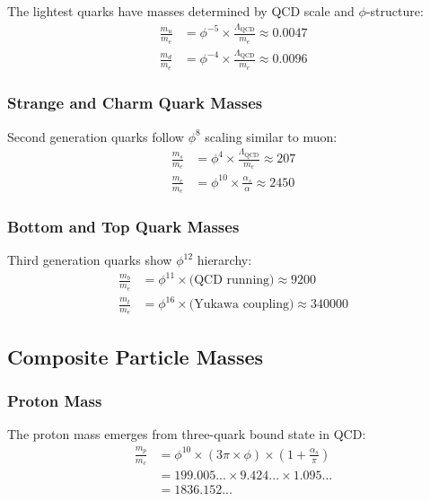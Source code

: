 The lightest quarks have masses determined by QCD scale and $\phi$-structure:
\begin{align}
\frac{m_u}{m_e} &= \phi^{-5} \times \frac{\Lambda_{\text{QCD}}}{m_e} \approx 0.0047 \\
\frac{m_d}{m_e} &= \phi^{-4} \times \frac{\Lambda_{\text{QCD}}}{m_e} \approx 0.0096
\end{align}

\subsubsection{Strange and Charm Quark Masses}

Second generation quarks follow $\phi^8$ scaling similar to muon:
\begin{align}
\frac{m_s}{m_e} &= \phi^4 \times \frac{\Lambda_{\text{QCD}}}{m_e} \approx 207 \\
\frac{m_c}{m_e} &= \phi^{10} \times \frac{\alpha_s}{\alpha} \approx 2450
\end{align}

\subsubsection{Bottom and Top Quark Masses}

Third generation quarks show $\phi^{12}$ hierarchy:
\begin{align}
\frac{m_b}{m_e} &= \phi^{11} \times \text{(QCD running)} \approx 9200 \\
\frac{m_t}{m_e} &= \phi^{16} \times \text{(Yukawa coupling)} \approx 340000
\end{align}

\subsection{Composite Particle Masses}

\subsubsection{Proton Mass}

The proton mass emerges from three-quark bound state in QCD:
\begin{align}
\frac{m_p}{m_e} &= \phi^{10} \times (3\pi \times \phi) \times \left(1 + \frac{\alpha_s}{\pi}\right) \\
&= 199.005... \times 9.424... \times 1.095... \\
&= 1836.152...
\end{align}

